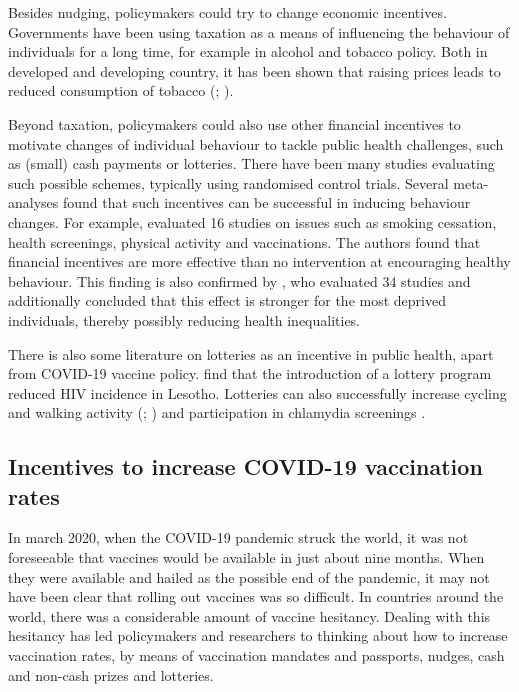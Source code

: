 \documentclass{scrbook}
\begin{document}
Besides nudging, policymakers could try to change economic incentives.
Governments have been using taxation as a means of influencing the
behaviour of individuals for a long time, for example in alcohol and
tobacco policy. Both in developed and developing country, it has been
shown that raising prices leads to reduced consumption of tobacco
(\cite{yeh_effects_2017}; \cite{immurana_effects_2021}).

Beyond taxation, policymakers could also use other financial incentives
to motivate changes of individual behaviour to tackle public health
challenges, such as (small) cash payments or lotteries. There have been
many studies evaluating such possible schemes, typically using
randomised control trials. Several meta-analyses found that such
incentives can be successful in inducing behaviour changes. For example,
\textcite{giles_effectiveness_2014} evaluated 16 studies on issues such
as smoking cessation, health screenings, physical activity and
vaccinations. The authors found that financial incentives are more
effective than no intervention at encouraging healthy behaviour. This
finding is also confirmed by \textcite{mantzari_personal_2015}, who
evaluated 34 studies and additionally concluded that this effect is
stronger for the most deprived individuals, thereby possibly reducing
health inequalities.

There is also some literature on lotteries as an incentive in public
health, apart from COVID-19 vaccine policy.
\textcite{bjorkman_nyqvist_incentivizing_2018} find that the
introduction of a lottery program reduced HIV incidence in Lesotho.
Lotteries can also successfully increase cycling and walking activity
(\cite{ciccone_using_2021}; \cite{patel_randomized_2018}) and
participation in chlamydia screenings \parencite{niza_vouchers_2014}.

\subsection{Incentives to increase COVID-19 vaccination rates}

In march 2020, when the COVID-19 pandemic struck the world, it was not
foreseeable that vaccines would be available in just about nine months.
When they were available and hailed as the possible end of the pandemic,
it may not have been clear that rolling out vaccines was so difficult.
In countries around the world, there was a considerable amount of
vaccine hesitancy. Dealing with this hesitancy has led policymakers and
researchers to thinking about how to increase vaccination rates, by
means of vaccination mandates and passports, nudges, cash and non-cash
prizes and lotteries.
\end{document}

